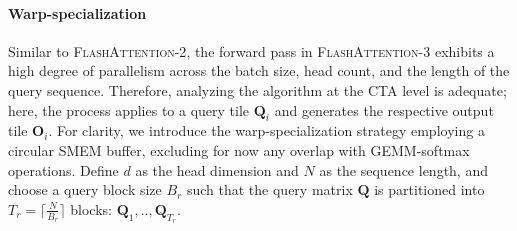 \begin{enumerate}
\paragraph{Warp-specialization}
Similar to \textsc{FlashAttention-2}, the forward pass in \textsc{FlashAttention-3} exhibits a high degree of parallelism across the batch size, head count, and the length of the query sequence. Therefore, analyzing the algorithm at the CTA level is adequate; here, the process applies to a query tile $\mathbf{Q}_i$ and generates the respective output tile $\mathbf{O}_i$. For clarity, we introduce the warp-specialization strategy employing a circular SMEM buffer, excluding for now any overlap with GEMM-softmax operations. Define $d$ as the head dimension and $N$ as the sequence length, and choose a query block size $B_r$ such that the query matrix $\mathbf{Q}$ is partitioned into $T_r = \lceil \frac{N}{B_r} \rceil$ blocks: $\mathbf{Q}_1, .., \mathbf{Q}_{T_r}$.


\end{enumerate}

